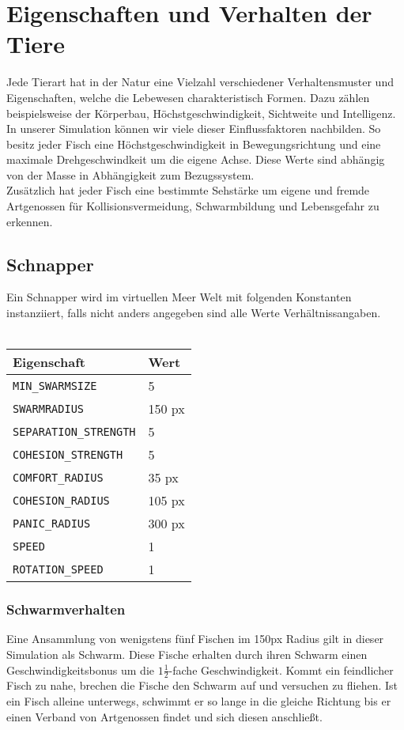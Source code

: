 \documentclass[11pt]{article}
\begin{document}
\section{Eigenschaften und Verhalten der Tiere}
Jede Tierart hat in der Natur eine Vielzahl verschiedener Verhaltensmuster und Eigenschaften, welche die Lebewesen charakteristisch Formen. Dazu zählen beispielsweise der Körperbau, Höchstgeschwindigkeit, Sichtweite und Intelligenz. In unserer Simulation können wir viele dieser Einflussfaktoren nachbilden.
So besitz jeder Fisch eine Höchstgeschwindigkeit in Bewegungsrichtung und eine maximale Drehgeschwindkeit um die eigene Achse. Diese Werte sind abhängig von der Masse in Abhängigkeit zum Bezugssystem.\\
Zusätzlich hat jeder Fisch eine bestimmte Sehstärke um eigene und fremde Artgenossen für Kollisionsvermeidung, Schwarmbildung und Lebensgefahr zu erkennen.
\newpage
\subsection{Schnapper}
Ein Schnapper wird im virtuellen Meer Welt mit folgenden Konstanten instanziiert, falls nicht anders angegeben sind alle Werte Verhältnissangaben. \\\\
\begin{tabular}{|l|l|}
\hline
	\textbf{Eigenschaft} & \textbf{Wert}\\
\hline
\hline
	\lstinline[]$MIN_SWARMSIZE$  & 5\\
\hline
	\lstinline[]$SWARMRADIUS$ & 150 px\\
\hline
	\lstinline[]$SEPARATION_STRENGTH$ & 5\\
\hline
	\lstinline[]$COHESION_STRENGTH$ & 5\\
\hline
	\lstinline[]$COMFORT_RADIUS$ & 35 px\\
\hline
	\lstinline[]$COHESION_RADIUS$ & 105 px\\
\hline
	\lstinline[]$PANIC_RADIUS$ & 300 px\\
\hline
	\lstinline[]$SPEED$ & 1\\
\hline
	\lstinline[]$ROTATION_SPEED$ & 1\\
\hline
\end{tabular}

\subsubsection{Schwarmverhalten}
Eine Ansammlung von wenigstens fünf Fischen im 150px Radius gilt in dieser Simulation als Schwarm. Diese Fische erhalten durch ihren Schwarm einen Geschwindigkeitsbonus um die \( 1 \frac{1}{2} \)-fache Geschwindigkeit.
Kommt ein feindlicher Fisch zu nahe, brechen die Fische den Schwarm auf und versuchen zu fliehen. Ist ein Fisch alleine unterwegs, schwimmt er so lange in die gleiche Richtung bis er einen Verband von Artgenossen findet und sich diesen anschließt.
\end{document}
